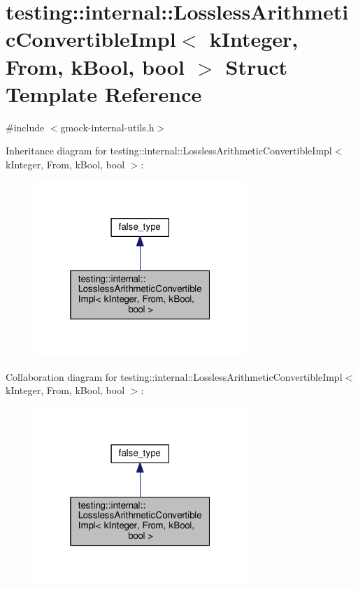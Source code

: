 \hypertarget{structtesting_1_1internal_1_1_lossless_arithmetic_convertible_impl_3_01k_integer_00_01_from_00_01k_bool_00_01bool_01_4}{}\section{testing\+:\+:internal\+:\+:Lossless\+Arithmetic\+Convertible\+Impl$<$ k\+Integer, From, k\+Bool, bool $>$ Struct Template Reference}
\label{structtesting_1_1internal_1_1_lossless_arithmetic_convertible_impl_3_01k_integer_00_01_from_00_01k_bool_00_01bool_01_4}


{\ttfamily \#include $<$gmock-\/internal-\/utils.\+h$>$}



Inheritance diagram for testing\+:\+:internal\+:\+:Lossless\+Arithmetic\+Convertible\+Impl$<$ k\+Integer, From, k\+Bool, bool $>$\+:
\nopagebreak
\begin{figure}[H]
\begin{center}
\leavevmode
\includegraphics[width=229pt]{structtesting_1_1internal_1_1_lossless_arithmetic_convertible_impl_3_01k_integer_00_01_from_00_070f96f9e8d2e93b0fcef730f9754fc28}
\end{center}
\end{figure}


Collaboration diagram for testing\+:\+:internal\+:\+:Lossless\+Arithmetic\+Convertible\+Impl$<$ k\+Integer, From, k\+Bool, bool $>$\+:
\nopagebreak
\begin{figure}[H]
\begin{center}
\leavevmode
\includegraphics[width=229pt]{structtesting_1_1internal_1_1_lossless_arithmetic_convertible_impl_3_01k_integer_00_01_from_00_002b51d63c6fbfdf6f974bde55a0b38db}
\end{center}
\end{figure}
